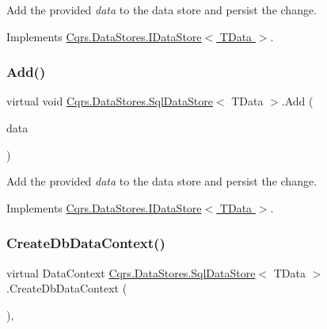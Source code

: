 Add the provided {\itshape data}  to the data store and persist the change. 



Implements \hyperlink{interfaceCqrs_1_1DataStores_1_1IDataStore_a114404daaf37fec9cc5547cd9a17858c}{Cqrs.\+Data\+Stores.\+I\+Data\+Store$<$ T\+Data $>$}.

\mbox{\label{classCqrs_1_1DataStores_1_1SqlDataStore_a45aa105f2571510223c6073804690487}} 
\subsubsection{\texorpdfstring{Add()}{Add()}\hspace{0.1cm}{\footnotesize\ttfamily [2/2]}}
{\footnotesize\ttfamily virtual void \hyperlink{classCqrs_1_1DataStores_1_1SqlDataStore}{Cqrs.\+Data\+Stores.\+Sql\+Data\+Store}$<$ T\+Data $>$.Add (\begin{DoxyParamCaption}\item[{I\+Enumerable$<$ T\+Data $>$}]{data }\end{DoxyParamCaption})\hspace{0.3cm}{\ttfamily [virtual]}}



Add the provided {\itshape data}  to the data store and persist the change. 



Implements \hyperlink{interfaceCqrs_1_1DataStores_1_1IDataStore_a906f3f2f80db7a549a4170eca4653e26}{Cqrs.\+Data\+Stores.\+I\+Data\+Store$<$ T\+Data $>$}.

\mbox{\label{classCqrs_1_1DataStores_1_1SqlDataStore_a8458af970314deef8eff6a4783b1c46f}} 
\subsubsection{\texorpdfstring{Create\+Db\+Data\+Context()}{CreateDbDataContext()}}
{\footnotesize\ttfamily virtual Data\+Context \hyperlink{classCqrs_1_1DataStores_1_1SqlDataStore}{Cqrs.\+Data\+Stores.\+Sql\+Data\+Store}$<$ T\+Data $>$.Create\+Db\+Data\+Context (\begin{DoxyParamCaption}{ }\end{DoxyParamCaption})\hspace{0.3cm}{\ttfamily [protected]}, {\ttfamily [virtual]}}



